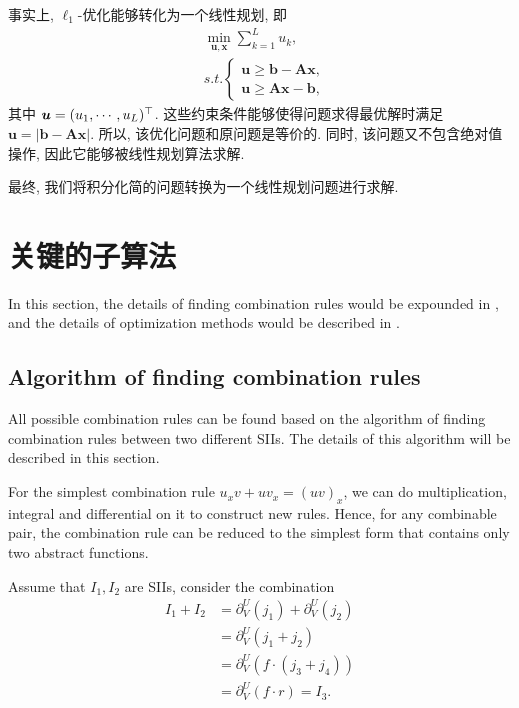 事实上, $\ell_1$-优化能够转化为一个线性规划\citep[pp. 195--196]{L1_regression}, 即
\begin{equation}
\begin{split}
&\underset{\bm u,\bm x}\min \sum_{k=1}^L{u_k},\\
&s.t. \left\{
\begin{matrix}
\bm{u}\ge \bm{b}-\bm{A}\bm{x},\\ 
\bm{u}\ge \bm{A}\bm{x}-\bm{b},
\end{matrix}
\right.
\end{split}
\label{LP}
\end{equation}
其中 $\bm u=(u_1,\cdots,u_L)^\top$. 这些约束条件能够使得问题求得最优解时满足$\bm u = |\bm{b}-\bm{A}\bm{x}|$. 所以, 该优化问题和原问题是等价的. 同时, 该问题又不包含绝对值操作, 因此它能够被线性规划算法求解. 

最终, 我们将积分化简的问题转换为一个线性规划问题进行求解.

\section{关键的子算法} \label{Details-03}
In this section, the details of finding combination rules would be expounded in , and the details of optimization methods would be described in .

\subsection{Algorithm of finding combination rules} \label{Combine-03}

All possible combination rules can be found based on the algorithm of finding combination rules between two different SIIs. The details of this algorithm will be described in this section. 

For the simplest combination rule $u_x v + u v_x = (uv)_x$, we can do multiplication, integral and  differential on it to construct new rules. Hence, for any combinable pair, the combination rule can be reduced to the simplest form that contains only two abstract functions. 

Assume that $I_1,I_2$ are SIIs, consider the combination 
\begin{equation}
\begin{split}
I_1+I_2 &= \partial^U_V(j_1) + \partial^U_V(j_2) \\
        &= \partial^U_V( j_1+j_2 )\\
        &= \partial^U_V( f\cdot(j_3+j_4) )\\ 
        &= \partial^U_V( f\cdot r ) = I_3 .
\end{split}
\label{combine_form}
\end{equation} 

